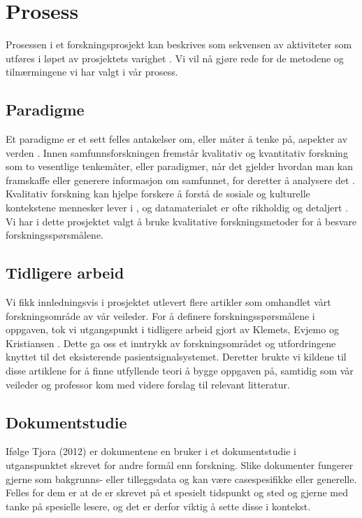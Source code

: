 \section{Prosess}
\label{chp:prosess}

Prosessen i et forskningsprosjekt kan beskrives som sekvensen av aktiviteter som utføres i løpet av prosjektets varighet \cite{Oates}. Vi vil nå gjøre rede for de metodene og tilnærmingene vi har valgt i vår prosess.

\subsection{Paradigme}
Et paradigme er et sett felles antakelser om, eller måter å tenke på, aspekter av verden \cite{Oates}. Innen samfunnsforskningen fremstår kvalitativ og kvantitativ forskning som to vesentlige tenkemåter, eller paradigmer, når det gjelder hvordan man kan framskaffe eller generere informasjon om samfunnet, for deretter å analysere det \cite{Tjora}. Kvalitativ forskning kan hjelpe forskere å forstå de sosiale og kulturelle kontekstene mennesker lever i \cite{Myers97}, og datamaterialet er ofte rikholdig og detaljert \cite{Oates}. Vi har i dette prosjektet valgt å bruke kvalitative forskningsmetoder for å besvare forskningsspørsmålene.

\subsection{Tidligere arbeid}
Vi fikk innledningsvis i prosjektet utlevert flere artikler som omhandlet vårt forskningsområde av vår veileder. For å definere forskningsspørsmålene i oppgaven, tok vi utgangspunkt i tidligere arbeid gjort av Klemets, Evjemo og Kristiansen \cite{klemets13, Klemets12, KlemetsRedundancy}. Dette ga oss et inntrykk av forskningsområdet og utfordringene knyttet til det eksisterende pasientsignalsystemet. Deretter brukte vi kildene til disse artiklene for å finne utfyllende teori å bygge oppgaven på, samtidig som vår veileder og professor kom med videre forslag til relevant litteratur.  

\subsection{Dokumentstudie}
Ifølge Tjora (2012) er dokumentene en bruker i et dokumentstudie i utganspunktet skrevet for andre formål enn forskning. Slike dokumenter fungerer gjerne som bakgrunns- eller tilleggsdata og kan være casespesifikke eller generelle. Felles for dem er at de er skrevet på et spesielt tidspunkt og sted og gjerne med tanke på spesielle lesere, og det er derfor viktig å sette disse i kontekst.

